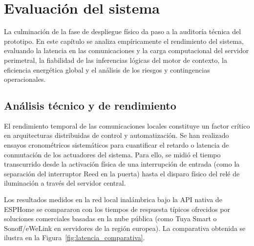 \newpage
\section{Evaluación del sistema}
\label{cap:evaluacion_sistema}

La culminación de la fase de despliegue físico da paso a la auditoría técnica del prototipo. En este capítulo se analiza empíricamente el rendimiento del sistema, evaluando la latencia en las comunicaciones y la carga computacional del servidor perimetral, la fiabilidad de las inferencias lógicas del motor de contexto, la eficiencia energética global y el análisis de los riesgos y contingencias operacionales.

\subsection{Análisis técnico y de rendimiento}
\label{sec:rendimiento_tecnico}
El rendimiento temporal de las comunicaciones locales constituye un factor crítico en arquitecturas distribuidas de control y automatización. Se han realizado ensayos cronométricos sistemáticos para cuantificar el retardo o latencia de conmutación de los actuadores del sistema. Para ello, se midió el tiempo transcurrido desde la activación física de una interrupción de entrada (como la separación del interruptor Reed en la puerta) hasta el disparo físico del relé de iluminación a través del servidor central. 

Los resultados medidos en la red local inalámbrica bajo la API nativa de ESPHome se compararon con los tiempos de respuesta típicos ofrecidos por soluciones comerciales basadas en la nube pública (como Tuya Smart o Sonoff/eWeLink en servidores de la región europea). La comparativa obtenida se ilustra en la Figura~\ref{fig:latencia_comparativa}.


